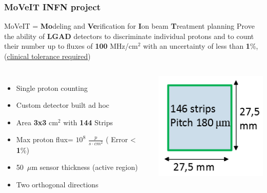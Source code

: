 \documentclass[aspectratio=169]{beamer}
\begin{document}
	\begin{frame}
	\frametitle{MoVeIT INFN project}
	\begin{center}
		{\Large \color{blue} MoVeIT = \textbf{Mo}deling and \textbf{Ve}rification for \textbf{I}on beam \textbf{T}reatment planning }
		\newline
		Prove the ability of \textbf{LGAD} detectors to discriminate individual protons and to count their number up to fluxes of \textbf{100} MHz/cm$^2$ with an uncertainty of {\color{blue}less than \textbf{1}\%}, (\underline{clinical tolerance required})
	\end{center}
	\begin{columns}
		\begin{itemize}
			\item Single proton counting
			\item Custom detector built ad hoc
			\item Area \textbf{3x3} cm${}^2$ with \textbf{144} Strips
			\item Max proton flux= $10^8$ $\frac{p}{s \cdot cm^2}$ ({\color{blue} Error < \textbf{1}\%})
			\item 50~$\mu$m sensor thickness (active region)
			\item Two orthogonal directions
		\end{itemize}
		\begin{center}
			\includegraphics[width=0.7 \textwidth]{IMG/Detector.PNG}
		\end{center}
	\end{columns}
	\end{frame}
\end{document}
